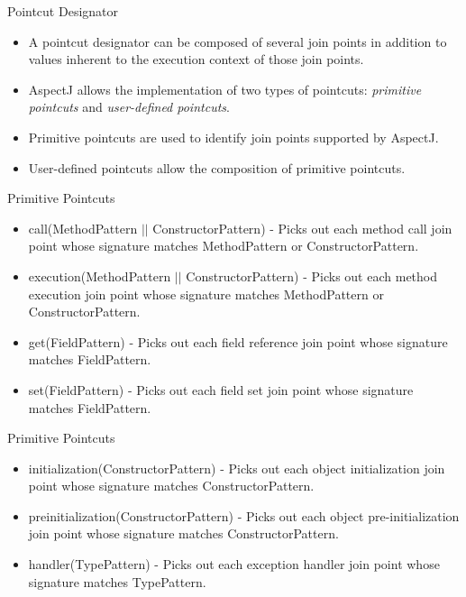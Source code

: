 \documentclass[11pt]{beamer}
\begin{document}
\begin{frame}{Pointcut Designator}
  \begin{itemize}
    \item A pointcut designator can be composed of several join points in addition to values inherent to the execution context of those join points.
    \item AspectJ allows the implementation of two types of pointcuts: \emph{primitive pointcuts} and \emph{user-defined pointcuts}. 
    \item Primitive pointcuts are used to identify join points supported by AspectJ. 
    \item User-defined pointcuts allow the composition of primitive pointcuts. 
  \end{itemize}
\end{frame}

\begin{frame}{Primitive Pointcuts}
  \begin{itemize}
    \item call(MethodPattern $||$ ConstructorPattern) - 
    Picks out each method call join point whose signature matches MethodPattern or ConstructorPattern. 
    \item execution(MethodPattern $||$ ConstructorPattern) -
    Picks out each method execution join point whose signature matches MethodPattern or ConstructorPattern. 
    \item get(FieldPattern) - 
    Picks out each field reference join point whose signature matches FieldPattern. 
    \item set(FieldPattern) - 
    Picks out each field set join point whose signature matches FieldPattern. 
  \end{itemize}
\end{frame}

\begin{frame}{Primitive Pointcuts}
  \begin{itemize}
    \item initialization(ConstructorPattern) -
    Picks out each object initialization join point whose signature matches ConstructorPattern. 
    \item preinitialization(ConstructorPattern) -
    Picks out each object pre-initialization join point whose signature matches ConstructorPattern. 
    \item handler(TypePattern) -
    Picks out each exception handler join point whose signature matches TypePattern. 
  \end{itemize}
\end{frame}
\end{document}
